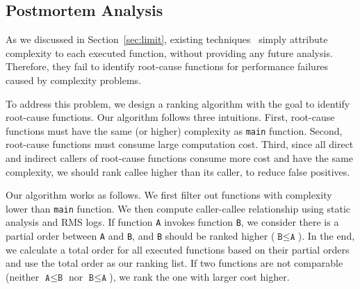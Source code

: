 \subsection{Postmortem Analysis}
\label{sec:rank}


As we discussed in Section~\ref{sec:limit}, 
existing techniques~\cite{Aprof1,Aprof2,AlgoProf} 
simply attribute complexity to each executed function, 
without providing any future analysis. 
Therefore, they fail to identify root-cause functions for 
performance failures caused by complexity problems. 

To address this problem, we design a ranking algorithm 
with the goal to identify root-cause functions. 
Our algorithm follows three intuitions. 
First, root-cause functions must have the same (or higher) 
complexity as \texttt{main} function.
Second, root-cause functions must consume large computation cost.
Third, since all direct and indirect callers of root-cause functions 
consume more cost and have the same complexity, 
we should rank callee higher than its caller, 
to reduce false positives. 

Our algorithm works as follows. 
We first filter out functions with complexity lower than \texttt{main} function.
We then compute caller-callee relationship using static analysis and RMS logs. 
If function \texttt{A} invokes function \texttt{B}, 
we consider there is a partial order between \texttt{A} and \texttt{B},
and \texttt{B} should be ranked higher ($\texttt{B} \leq \texttt{A}$). 
In the end, we calculate a total order for all executed functions based 
on their partial orders and use the total order as our ranking list. 
If two functions are not comparable 
(neither $\texttt{A} \leq \texttt{B}$ nor $\texttt{B} \leq \texttt{A}$), 
we rank the one with larger cost higher. 

